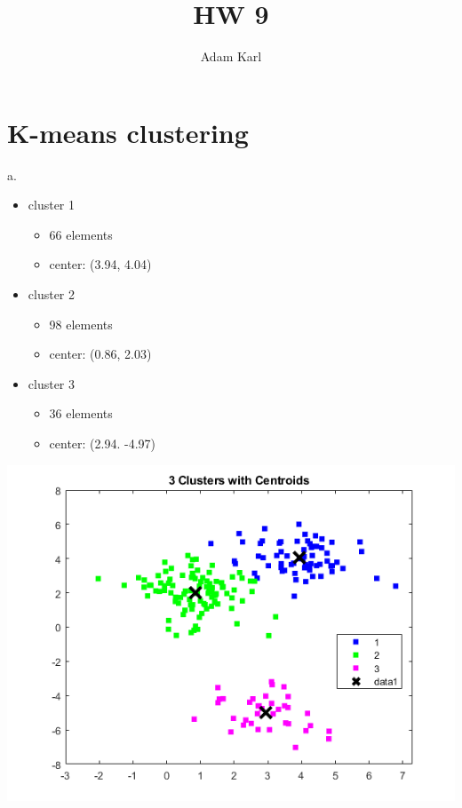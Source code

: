 \documentclass{article}
\title{HW 9}
\author{Adam Karl}
\begin{document}
\maketitle

\section{K-means clustering}

\noindent
a. 
\begin{itemize}
    \item cluster 1
    \begin{itemize}
        \item 66 elements
        \item center: (3.94, 4.04)
    \end{itemize}
    \item cluster 2
    \begin{itemize}
        \item 98 elements
        \item center: (0.86, 2.03)
    \end{itemize}
    \item cluster 3
    \begin{itemize}
        \item 36 elements
        \item center: (2.94. -4.97)
    \end{itemize}
\end{itemize}

\begin{center}
    \includegraphics[scale=1]{1a.png}
\end{center}
\end{document}
